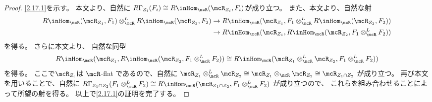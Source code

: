 \documentclass[uplatex,dvipdfmx]{jsarticle}
\begin{document}
\begin{proof}
  \ref{2.17.1}を示す。
  本文\cite[同型 (2.6.9)]{kashiwara2002sheaves}より、自然に
  \(R\Gamma_{Z_i}(F_i) \cong R\inHom_{\mcR}(\mcR_{Z_i},F_i)\)が成り立つ。
  また、本文\cite[射 (2.6.11)]{kashiwara2002sheaves}より、自然な射
  \begin{align*}
    R\inHom_{\mcR}(\mcR_{Z_1},F_1) \otimes_{\mcR}^L R\inHom_{\mcR}(\mcR_{Z_2},F_2)
    &\to R\inHom_{\mcR}(\mcR_{Z_1},F_1\otimes_{\mcR}^L R\inHom_{\mcR}(\mcR_{Z_2},F_2)) \\
    &\to R\inHom_{\mcR}(\mcR_{Z_1},R\inHom_{\mcR}(\mcR_{Z_2},F_1\otimes_{\mcR}^L F_2))
  \end{align*}
  を得る。
  さらに本文\cite[Proposition 2.6.3 (ii)]{kashiwara2002sheaves}より、
  自然な同型
  \[
  R\inHom_{\mcR}(\mcR_{Z_1},R\inHom_{\mcR}(\mcR_{Z_2},F_1\otimes_{\mcR}^L F_2))
  \cong R\inHom_{\mcR}(\mcR_{Z_1}\otimes_{\mcR}^L \mcR_{Z_2},F_1\otimes_{\mcR}^L F_2))
  \]
  を得る。
  ここで\(\mcR_{Z_i}\)は \(\mcR\)-flat であるので、自然に
  \(\mcR_{Z_1}\otimes_{\mcR}^L \mcR_{Z_2} \cong
  \mcR_{Z_1}\otimes_{\mcR} \mcR_{Z_2} \cong \mcR_{Z_1\cap Z_2}\)
  が成り立つ。
  再び本文\cite[同型 (2.6.9)]{kashiwara2002sheaves}を用いることで、自然に
  \(R\Gamma_{Z_1\cap Z_2}(F_1\otimes_{\mcR}^L F_2) \cong
  R\inHom_{\mcR}(\mcR_{Z_1\cap Z_2},F_1\otimes_{\mcR}^L F_2)\)
  が成り立つので、
  これらを組み合わせることによって所望の射を得る。
  以上で\ref{2.17.1}の証明を完了する。


\end{proof}
\end{document}
